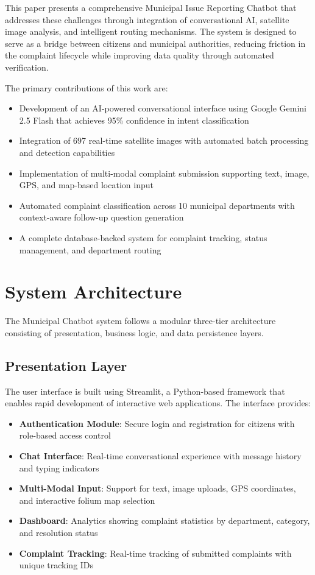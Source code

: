 \documentclass[11pt,a4paper]{article}
\begin{document}
This paper presents a comprehensive Municipal Issue Reporting Chatbot that addresses these challenges through integration of conversational AI, satellite image analysis, and intelligent routing mechanisms. The system is designed to serve as a bridge between citizens and municipal authorities, reducing friction in the complaint lifecycle while improving data quality through automated verification.

The primary contributions of this work are:
\begin{itemize}
    \item Development of an AI-powered conversational interface using Google Gemini 2.5 Flash that achieves 95\% confidence in intent classification
    \item Integration of 697 real-time satellite images with automated batch processing and detection capabilities
    \item Implementation of multi-modal complaint submission supporting text, image, GPS, and map-based location input
    \item Automated complaint classification across 10 municipal departments with context-aware follow-up question generation
    \item A complete database-backed system for complaint tracking, status management, and department routing
\end{itemize}

\section{System Architecture}

The Municipal Chatbot system follows a modular three-tier architecture consisting of presentation, business logic, and data persistence layers.

\subsection{Presentation Layer}

The user interface is built using Streamlit, a Python-based framework that enables rapid development of interactive web applications. The interface provides:

\begin{itemize}
    \item \textbf{Authentication Module}: Secure login and registration for citizens with role-based access control
    \item \textbf{Chat Interface}: Real-time conversational experience with message history and typing indicators
    \item \textbf{Multi-Modal Input}: Support for text, image uploads, GPS coordinates, and interactive folium map selection
    \item \textbf{Dashboard}: Analytics showing complaint statistics by department, category, and resolution status
    \item \textbf{Complaint Tracking}: Real-time tracking of submitted complaints with unique tracking IDs
\end{itemize}
\end{document}
